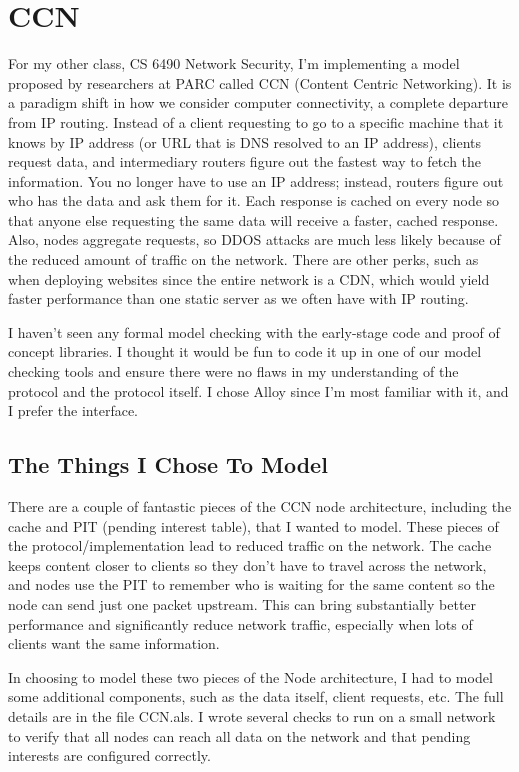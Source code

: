 \documentclass{article}
\begin{document}
\clearpage

\section{CCN}

For my other class, CS 6490 Network Security, I'm implementing a model proposed by researchers at PARC \cite{ccn} called CCN (Content Centric Networking). It is a paradigm shift in how we consider computer connectivity, a complete departure from IP routing. Instead of a client requesting to go to a specific machine that it knows by IP address (or URL that is DNS resolved to an IP address), clients request data, and intermediary routers figure out the fastest way to fetch the information. You no longer have to use an IP address; instead, routers figure out who has the data and ask them for it. Each response is cached on every node so that anyone else requesting the same data will receive a faster, cached response. Also, nodes aggregate requests, so DDOS attacks are much less likely because of the reduced amount of traffic on the network. There are other perks, such as when deploying websites since the entire network is a CDN, which would yield faster performance than one static server as we often have with IP routing.

I haven't seen any formal model checking with the early-stage code and proof of concept libraries. I thought it would be fun to code it up in one of our model checking tools and ensure there were no flaws in my understanding of the protocol and the protocol itself. I chose Alloy since I'm most familiar with it, and I prefer the interface.

\subsection{The Things I Chose To Model}

There are a couple of fantastic pieces of the CCN node architecture, including the cache and PIT (pending interest table), that I wanted to model. These pieces of the protocol/implementation lead to reduced traffic on the network. The cache keeps content closer to clients so they don't have to travel across the network, and nodes use the PIT to remember who is waiting for the same content so the node can send just one packet upstream. This can bring substantially better performance and significantly reduce network traffic, especially when lots of clients want the same information.

In choosing to model these two pieces of the Node architecture, I had to model some additional components, such as the data itself, client requests, etc. The full details are in the file CCN.als. I wrote several checks to run on a small network to verify that all nodes can reach all data on the network and that pending interests are configured correctly.
\end{document}
